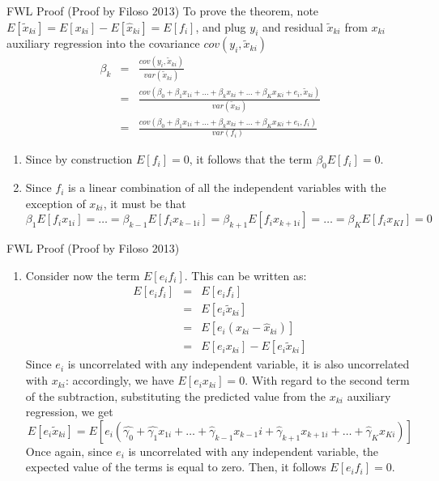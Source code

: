 \documentclass{beamer}
\begin{document}
\begin{frame}[plain, shrink=20]

\bigskip

	\begin{block}{FWL Proof  (Proof by Filoso 2013)}
	To prove the theorem, note $E[\tilde{x}_{ki}]=E[x_{ki}]-E[\widehat{x}_{ki}]=E[f_i]$, and plug $y_i$ and residual $\tilde{x}_{ki}$ from $x_{ki}$ auxiliary regression into the covariance $cov(y_i, \tilde{x}_{ki})$
	\begin{eqnarray*}
	\beta_k &=& \frac{ cov(y_i, \tilde{x}_{ki})}{var(\tilde{x}_{ki})} \\
			 &=& \frac{ cov(\beta_0 + \beta_1x_{1i} + \dots + \beta_kx_{ki} + \dots + \beta_Kx_{Ki} + e_i, \tilde{x}_{ki})}{var(\tilde{x}_{ki})} \\
			&=& \frac{ cov(\beta_0 + \beta_1x_{1i} + \dots + \beta_kx_{ki} + \dots + \beta_Kx_{Ki} + e_i,f_i)}{var(f_i)}
	\end{eqnarray*}
	\begin{enumerate}
	\item Since by construction $E[f_i]=0$, it follows that the term $\beta_0E[f_i]=0$.
	\item Since $f_i$ is a linear combination of all the independent variables with the exception of $x_{ki}$, it must be that$$\beta_1E[f_ix_{1i}] = \dots = \beta_{k-1}E[f_ix_{k-1 i}] = \beta_{k+1}E[f_ix_{k+1 i}] = \dots = \beta_KE[f_ix_{KI}] = 0$$
	\end{enumerate}
	\end{block}
\end{frame}


\begin{frame}[plain, shrink=20]

	\begin{block}{FWL Proof  (Proof by Filoso 2013)}
		\begin{enumerate}\addtocounter{enumi}{2}
		\item Consider now the term $E[e_if_i]$.  This can be written as:
			\begin{eqnarray*}
			E[e_if_i] &=& E[e_if_i] \\
			&=& E[e_i\tilde{x}_{ki}] \\
			&=& E[e_i(x_{ki} - \widehat{x}_{ki})] \\
			&=& E[e_ix_{ki}] - E[e_i\tilde{x}_{ki}]
			\end{eqnarray*}Since $e_i$ is uncorrelated with any independent variable, it is also uncorrelated with $x_{ki}$: accordingly, we have $E[e_ix_{ki}]=0$. With regard to the second term of the subtraction, substituting the predicted value from the $x_{ki}$ auxiliary regression, we get$$E[e_i\tilde{x}_{ki}] = E[e_i(\widehat{\gamma_0} + \widehat{\gamma_1}x_{1i} + \dots + \widehat{\gamma}_{k-1}x_{k-1}i+\widehat{\gamma}_{k+1}x_{k+1 i} + \dots + \widehat{\gamma}_Kx_{Ki})]$$Once again, since $e_i$ is uncorrelated with any independent variable, the expected value of the terms is equal to zero.  Then, it follows $E[e_if_i]=0$.
		
		\end{enumerate}
	\end{block}

\end{frame}
\end{document}
